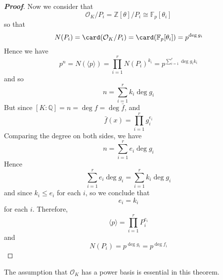 \begin{proof}[\bf Proof]
Now we consider that
$$\mathcal{O}_K/P_i =\mathbb{Z}[\theta]/P_i \cong \mathbb{F}_p[\theta_i]$$
so that
$$N(P_i)=\card(\mathcal{O}_K/P_i)=\card(\mathbb{F}_p[\theta_i])=p^{\deg{g_i}}$$
Hence we have
$$p^n=N(\langle p \rangle)=\prod_{i=1}^r N(P_i)^{k_i}=p^{\sum_{i=1}^r \deg{g_i}k_i}$$
and so
$$n=\sum_{i=1}^r k_i\deg{g_i}$$
But since $[K:\mathbb{Q}]=n=\deg{f}=\deg{\bar{f}}$, and
$$\bar{f}(x)=\prod_{i=1}^r g^{e_i}_i$$
Comparing the degree on both sides, we have
$$n=\sum_{i=1}^r e_i \deg{g_i}$$
Hence
$$\sum_{i=1}^r e_i \deg{g_i}=\sum_{i=1}^r k_i \deg{g_i}$$
and since $k_i \le e_i$ for each $i$, so we conclude that
$$e_i=k_i$$ for each $i$.
Therefore,
$$\langle p \rangle=\prod_{i=1}^r P^{e_i}_i$$
and
$$N(P_i)=p^{\deg{g_i}}=p^{\deg{f_i}}$$
\end{proof}
The assumption that $\mathcal{O}_K$ has a power basis is essential in this theorem.



